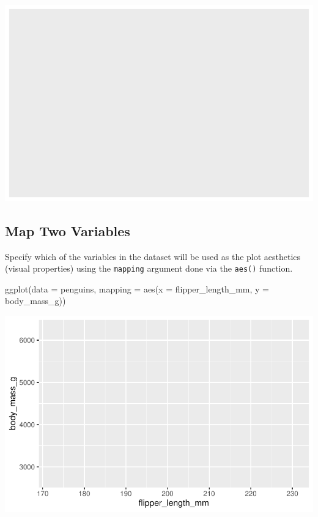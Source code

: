 \documentclass[
  letterpaper,
  DIV=11,
  numbers=noendperiod]{scrreprt}
\newenvironment{Shaded}{\begin{snugshade}}{\end{snugshade}}
\newcommand{\AttributeTok}[1]{\textcolor[rgb]{0.40,0.45,0.13}{#1}}
\newcommand{\FunctionTok}[1]{\textcolor[rgb]{0.28,0.35,0.67}{#1}}
\newcommand{\NormalTok}[1]{\textcolor[rgb]{0.00,0.23,0.31}{#1}}
\begin{document}
\includegraphics{src/r-for-data-science/01-data-viz_files/figure-pdf/unnamed-chunk-8-1.pdf}

\subsection{Map Two Variables}\label{map-two-variables}

Specify which of the variables in the dataset will be used as the plot
aesthetics (visual properties) using the \texttt{mapping} argument done
via the \texttt{aes()} function.

\begin{Shaded}
\begin{Highlighting}[]
\FunctionTok{ggplot}\NormalTok{(}\AttributeTok{data =}\NormalTok{ penguins,}
       \AttributeTok{mapping =} \FunctionTok{aes}\NormalTok{(}\AttributeTok{x =}\NormalTok{ flipper\_length\_mm, }\AttributeTok{y =}\NormalTok{ body\_mass\_g))}
\end{Highlighting}
\end{Shaded}

\includegraphics{src/r-for-data-science/01-data-viz_files/figure-pdf/unnamed-chunk-9-1.pdf}
\end{document}

